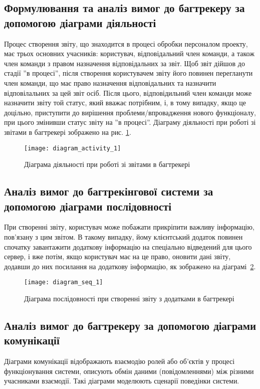 \documentclass[../main.tex]{subfiles}
\begin{document}
	\subsection{Формулювання та аналіз вимог до багтрекеру за допомогою діаграми діяльності}
		Процес створення звіту, що знаходится в процесі обробки персоналом проекту, має трьох основних учасників: користувач, відповідальний член команди, а також член команди з правом назначення відповідальних за звіт. Щоб звіт дійшов до стадії ''в процесі'', після створення користувачем звіту його повинен перегланути член команди, що має право назначення відповідальних та назначити відповілальних за цей звіт осіб. Після цього, відповідильний член команди може назначити звіту той статус, який вважає потрібним, і, в тому випадку, якщо це доцільно, приступити до вирішення проблеми/впровадження нового функціоналу, при цього змінивши статус звіту на ''в процесі''. Діаграму діяльності при роботі зі звітами в багтрекері зображено на рис. \ref{diag_activity}.
		
		\begin{figure}[H]
			\centering
			\texttt{[image: diagram\_activity\_1]}
			\caption{Діаграма діяльності при роботі зі звітами в багтрекері}
			\label{diag_activity}
		\end{figure}
	
	\subsection{Аналіз вимог до багтрекінгової системи за допомогою діаграми послідовності}
		При створенні звіту, користувач може побажати прикріпити важливу інформацію, пов'язану з цим звітом. В такому випадку, йому клієнтський додаток повинен спочатку завантажити додаткову інформацію на спеціально відведений для цього сервер, і вже потім, якщо користувач має на це право, оновити дані звіту, додавши до них посилання на додаткову інформацію, як зображено на діаграмі~\ref{figure_diag_seq_1}.
		
		\begin{figure}[H]
			\centering
			\texttt{[image: diagram\_seq\_1]}
			\caption{Діаграма послідовності при створенні звіту з додатками в багтрекері}
			\label{figure_diag_seq_1}
		\end{figure}
	
	\subsection{Аналіз вимог до багтрекеру за допомогою діаграми комунікації}
		Діаграми комунікації відображають взаємодію ролей або об'єктів у процесі функціонування системи, описують обмін даними (повідомленнями) між різними учасниками взаємодії. Такі діаграми моделюють сценарії поведінки системи.~\cite{chnu_designing_systems}
		
\end{document}
